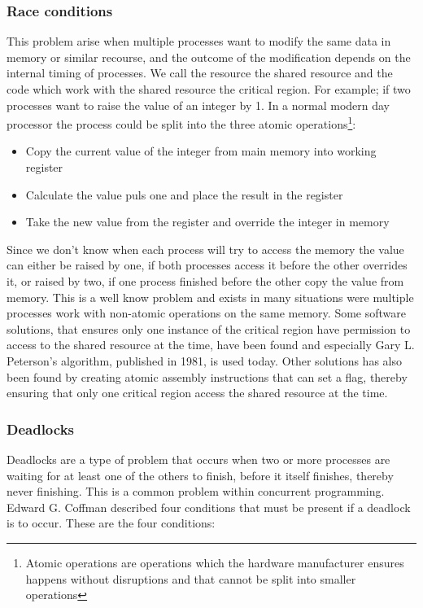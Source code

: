 \subsubsection{Race conditions}
This problem arise when multiple processes want to modify the same data in memory or similar recourse, and the outcome of the modification depends on the internal timing of processes. We call the resource the shared resource and the code which work with the shared resource the critical region. For example; if two processes want to raise the value of an integer by 1. In a normal modern day processor the process could be split into the three atomic operations\footnote{Atomic operations are operations which the hardware manufacturer ensures happens without disruptions and that cannot be split into smaller operations}:

\begin{itemize}
\item Copy the current value of the integer from main memory into working register
\item Calculate the value puls one and place the result in the register
\item Take the new value from the register and override the integer in memory
\end{itemize}

Since we don't know when each process will try to access the memory the value can either be raised by one, if both processes access it before the other overrides it, or raised by two, if one process finished before the other copy the value from memory. This is a well know problem and exists in many situations were multiple processes work with non-atomic operations on the same memory. Some software solutions, that ensures only one instance of the critical region have permission to access to the shared resource at the time, have been found and especially Gary L. Peterson's algorithm, published in 1981, is used today. Other solutions has also been found by creating atomic assembly instructions that can set a flag, thereby ensuring that only one critical region access the shared resource at the time.

\subsubsection{Deadlocks}

Deadlocks are a type of problem that occurs when two or more processes are waiting for at least one of the others to finish, before it itself finishes, thereby never finishing. This is a common problem within concurrent programming. Edward G. Coffman described four conditions that must be present if a deadlock is to occur.  These are the four conditions:

